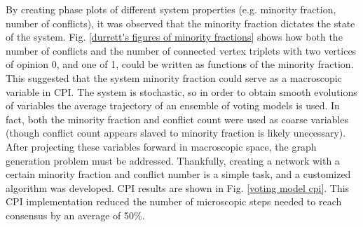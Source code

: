 \documentclass[11pt]{article}
\begin{document}
By creating phase plots of different system properties (e.g. minority fraction, number of conflicts), it was observed that the minority fraction dictates the state of the system. Fig. \ref{durrett's figures of minority fractions} shows how both the number of conflicts and the number of connected vertex triplets with two vertices of opinion 0, and one of 1, could be written as functions of the minority fraction. This suggested that the system minority fraction could serve as a macroscopic variable in CPI. The system is stochastic, so in order to obtain smooth evolutions of variables the average trajectory of an ensemble of voting models is used. In fact, both the minority fraction and conflict count were used as coarse variables (though conflict count appears slaved to minority fraction is likely unecessary). After projecting these variables forward in macroscopic space, the graph generation problem must be addressed. Thankfully, creating a network with a certain minority fraction and conflict number is a simple task, and a customized algorithm was developed. CPI results are shown in Fig. \ref{voting model cpi}. This CPI implementation reduced the number of microscopic steps needed to reach consensus by an average of 50\%.
\end{document}
